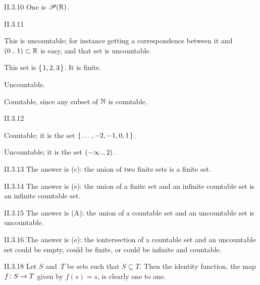 %
\begin{ans}{II.3.10}
One is $\mathscr{P}(\mathbb{R})$.
\end{ans}
%
\begin{ans}{II.3.11}
\begin{exparts}
\item This is uncountable; for instance getting a correspondence between it
and $(0\mathinner{{\ldotp}{\ldotp}} 1)\subset\mathbb{R}$ is easy, and that set is uncountable.
\item This set is $\set{1,2,3}$.
It is finite.
\item Uncountable.
\item Countable, since any subset of $\mathbb{N}$ is countable.
\end{exparts}
\end{ans}
%
\begin{ans}{II.3.12}
\begin{exparts}
\item Countable; it is the set $\set{\ldots,-2,-1,0,1}$.
\item Uncountable; it is the set $(-\infty\mathinner{{\ldotp}{\ldotp}} 2)$.
\end{exparts}
\end{ans}
%
\begin{ans}{II.3.13}
The answer is (c): the union of two finite sets is a finite set.
\end{ans}
%
\begin{ans}{II.3.14}
The answer is (e): the union of a finite set and an infinite countable set
is an infinite countable set.
\end{ans}
%
\begin{ans}{II.3.15}
The answer is (A): the union of a countable set and an uncountable set
is uncountable.
\end{ans}
%
\begin{ans}{II.3.16}
The answer is (e): the iontersection of a countable set and an uncountable set
could be empty, could be finite, or could be infinite and countable.
\end{ans}
%
%
\begin{ans}{II.3.18}
Let $S$ and~$T$ be sets such that $S\subseteq T$.
Then the identity function, the map $\mbox{$f\colon S\to T$}$ given by $f(s)=s$,
is clearly one to one.
\end{ans}
